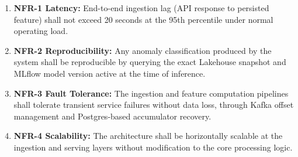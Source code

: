   \begin{enumerate}                                                                                                                                       
      \item \textbf{NFR-1 Latency:} End-to-end ingestion lag (API response
      to persisted feature) shall not exceed 20 seconds at the 95th percentile                                                                            
      under normal operating load.                                                                                                                        
                                                                                                                                                          
      \item \textbf{NFR-2 Reproducibility:} Any anomaly classification                                                                                    
      produced by the system shall be reproducible by querying the exact                                                                                  
      Lakehouse snapshot and MLflow model version active at the time of                                                                                   
      inference.                                                                                                                                          
                                                                                                                                                          
      \item \textbf{NFR-3 Fault Tolerance:} The ingestion and feature                                                                                     
      computation pipelines shall tolerate transient service failures without
      data loss, through Kafka offset management and Postgres-based                                                                                       
      accumulator recovery.                                                                                                                               
                                                                                                                                                          
      \item \textbf{NFR-4 Scalability:} The architecture shall be horizontally                                                                            
      scalable at the ingestion and serving layers without modification to                                                                                
      the core processing logic.                                                                                                                          
   

\end{enumerate}
